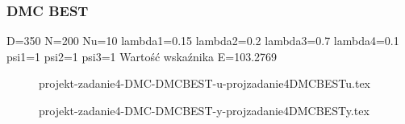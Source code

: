 \subsubsection{DMC BEST}
D=350 N=200 Nu=10 lambda1=0.15 lambda2=0.2 lambda3=0.7 lambda4=0.1
psi1=1 psi2=1 psi3=1 Wartość wskaźnika E=103.2769


\ifdefined\CompileFigures
\begin{figure}[H] 
    \centering
    
    \caption{projekt-zadanie4-DMC-DMCBEST-u-projzadanie4DMCBESTu.tex}
    \label{projekt:zad4:figure:projzadanie4DMCBESTu}
\end{figure}
\fi


\ifdefined\CompileFigures
\begin{figure}[H] 
    \centering
    
    \caption{projekt-zadanie4-DMC-DMCBEST-y-projzadanie4DMCBESTy.tex}
    \label{projekt:zad4:figure:projzadanie4DMCBESTy}
\end{figure}
\fi

\newpage

